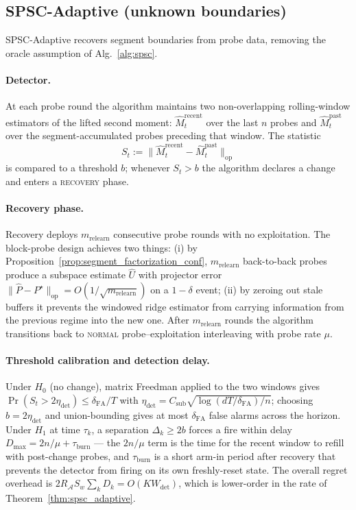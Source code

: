 \documentclass{article}
\newcommand{\op}{\mathrm{op}}
\newcommand{\cA}{\mathcal{A}}
\begin{document}
\subsection{SPSC-Adaptive (unknown boundaries)}
\label{app:alg_adaptive}

SPSC-Adaptive recovers segment boundaries from probe data, removing
the oracle assumption of Alg.~\ref{alg:spsc}.

\paragraph{Detector.}
At each probe round the algorithm maintains two non-overlapping
rolling-window estimators of the lifted second moment:
$\widehat M_t^{\mathrm{recent}}$ over the last $n$ probes and
$\widehat M_t^{\mathrm{past}}$ over the segment-accumulated probes
preceding that window. The statistic
\begin{equation}
S_t := \bigl\|\widehat M_t^{\mathrm{recent}} - \widehat M_t^{\mathrm{past}}\bigr\|_\op
\label{eq:detector}
\end{equation}
is compared to a threshold $b$; whenever $S_t > b$ the algorithm
declares a change and enters a \textsc{recovery} phase.

\paragraph{Recovery phase.}
Recovery deploys $m_{\mathrm{relearn}}$ consecutive probe rounds with
no exploitation. The block-probe design achieves two things: (i) by
Proposition~\ref{prop:segment_factorization_conf}, $m_{\mathrm{relearn}}$
back-to-back probes produce a subspace estimate $\widehat U$ with
projector error
$\|\widehat P - P^\star\|_\op = O(1/\sqrt{m_{\mathrm{relearn}}})$ on a
$1-\delta$ event; (ii) by zeroing out stale buffers it prevents the
windowed ridge estimator from carrying information from the previous
regime into the new one. After $m_{\mathrm{relearn}}$ rounds the
algorithm transitions back to \textsc{normal} probe--exploitation
interleaving with probe rate $\mu$.

\paragraph{Threshold calibration and detection delay.}
Under $H_0$ (no change), matrix Freedman applied to the two windows
gives $\Pr(S_t > 2\eta_{\mathrm{det}}) \le \delta_{\mathrm{FA}}/T$ with
$\eta_{\mathrm{det}} = C_{\mathrm{sub}}\sqrt{\log(dT/\delta_{\mathrm{FA}})/n}$;
choosing $b = 2\eta_{\mathrm{det}}$ and union-bounding gives at most
$\delta_{\mathrm{FA}}$ false alarms across the horizon. Under $H_1$ at
time $\tau_k$, a separation $\Delta_k \ge 2b$ forces a fire within
delay $D_{\max} = 2n/\mu + \tau_{\mathrm{burn}}$ — the $2n/\mu$ term is
the time for the recent window to refill with post-change probes, and
$\tau_{\mathrm{burn}}$ is a short arm-in period after recovery that
prevents the detector from firing on its own freshly-reset state.
The overall regret overhead is $2R_\cA S_w\sum_k D_k = O(K
W_{\mathrm{det}})$, which is lower-order in the rate of
Theorem~\ref{thm:spsc_adaptive}.
\end{document}
